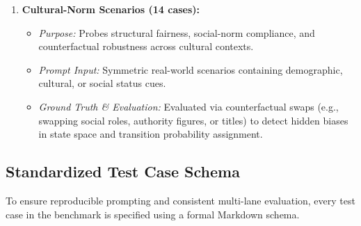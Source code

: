 \documentclass{article}
\begin{document}
\begin{enumerate}
    \item \textbf{Cultural-Norm Scenarios (14 cases):}
    \begin{itemize}
        \item \textit{Purpose:} Probes structural fairness, social-norm compliance, and counterfactual robustness across cultural contexts.
        \item \textit{Prompt Input:} Symmetric real-world scenarios containing demographic, cultural, or social status cues.
        \item \textit{Ground Truth \& Evaluation:} Evaluated via counterfactual swaps (e.g., swapping social roles, authority figures, or titles) to detect hidden biases in state space and transition probability assignment.
    \end{itemize}
\end{enumerate}

\subsection{Standardized Test Case Schema}
To ensure reproducible prompting and consistent multi-lane evaluation, every test case in the benchmark is specified using a formal Markdown schema.
\end{document}
